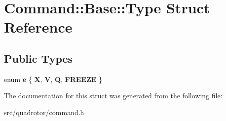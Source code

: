 \hypertarget{structCommand_1_1Base_1_1Type}{\section{\-Command\-:\-:\-Base\-:\-:\-Type \-Struct \-Reference}
\label{structCommand_1_1Base_1_1Type}
}
\subsection*{\-Public \-Types}
\begin{DoxyCompactItemize}
\item 
enum {\bfseries e} \{ {\bfseries \-X}, 
{\bfseries \-V}, 
{\bfseries \-Q}, 
{\bfseries \-F\-R\-E\-E\-Z\-E}
 \}
\end{DoxyCompactItemize}


\-The documentation for this struct was generated from the following file\-:\begin{DoxyCompactItemize}
\item 
src/quadrotor/command.\-h\end{DoxyCompactItemize}
